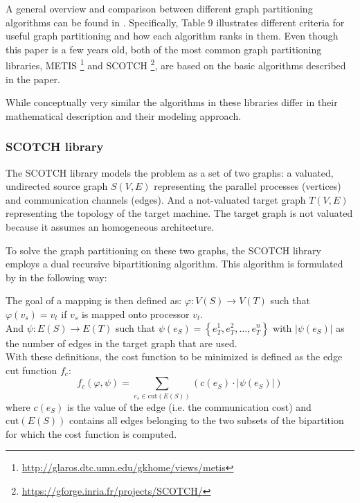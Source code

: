 A general overview and comparison between different graph partitioning algorithms can be found in \citet{karypis1998fast}.
Specifically, Table 9 illustrates different criteria for useful graph partitioning and how each algorithm ranks in them.
Even though this paper is a few years old, both of the most common graph partitioning libraries, METIS \footnote[1]{\href{http://glaros.dtc.umn.edu/gkhome/views/metis}{http://glaros.dtc.umn.edu/gkhome/views/metis}} and SCOTCH \footnote[2]{\href{https://gforge.inria.fr/projects/SCOTCH/}{https://gforge.inria.fr/projects/SCOTCH/}}, are based on the basic algorithms described in the paper.

While conceptually very similar the algorithms in these libraries differ in their mathematical description and their modeling approach.

\subsubsection{SCOTCH library}
The SCOTCH library models the problem as a set of two graphs:
a valuated, undirected source graph $S(V, E)$ representing the parallel processes (vertices) and communication channels (edges). And a not-valuated target graph $T(V, E)$ representing the topology of the target machine.
The target graph is not valuated because it assumes an homogeneous architecture.

To solve the graph partitioning on these two graphs, the SCOTCH library employs a dual recursive bipartitioning algorithm.
This algorithm is formulated by \citet{pellegrini1994static} in the following way:

The goal of a mapping is then defined as:
$\varphi : V\left(S\right) \rightarrow V\left(T\right)$ such that $\varphi\left(v_s\right) = v_t $ if $v_s$ is mapped onto processor $v_t$.
\\
And $\psi : E\left(S\right) \rightarrow E\left(T\right)$ such that $\psi\left(e_S\right) = \left\{ e_T^1, e_T^2, \dots, e_T^n \right\}$ with $\left| \psi\left(e_S\right) \right|$ as the number of edges in the target graph that are used.
\\
With these definitions, the cost function to be minimized is defined as the edge cut function $f_c$:
\begin{equation}
f_c\left(\varphi, \psi \right) = \sum_{e_s \in \text{cut} \left(E\left(S\right)\right)} \left(c\left(e_S\right) \cdot \left| \psi\left(e_S\right) \right| \right)
\end{equation}
where $c\left(e_S\right)$ is the value of the edge (i.e. the communication cost) and $\text{cut} \left(E\left(S\right)\right)$ contains all edges belonging to the two subsets of the bipartition for which the cost function is computed.

